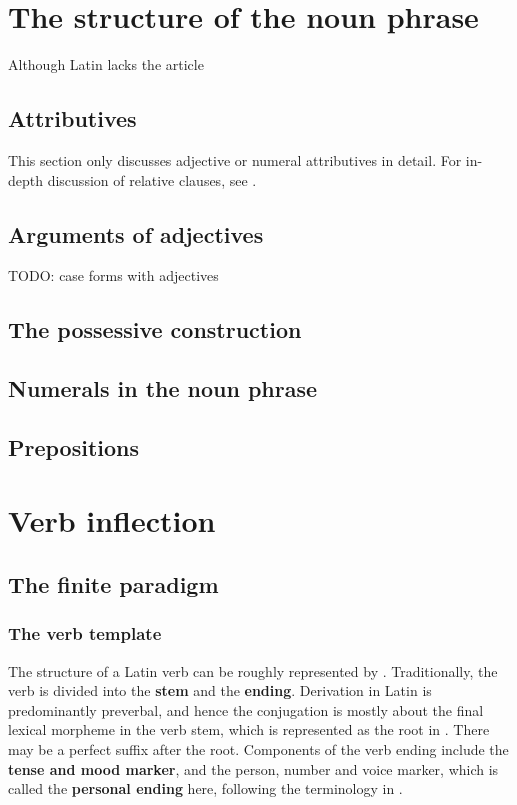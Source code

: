 \documentclass[a4paper, oneside]{report}
\newcommand*{\citesec}[1]{\S~{#1}}
\newcommand*{\concept}[1]{\textbf{#1}}
\begin{document}
\chapter{The structure of the noun phrase}

Although Latin lacks the article 

\section{Attributives}

This section only discusses adjective or numeral attributives in detail.
For in-depth discussion of relative clauses, see .

\section{Arguments of adjectives}

TODO: case forms with adjectives

\section{The possessive construction}

\section{Numerals in the noun phrase}

\section{Prepositions}

\chapter{Verb inflection}

\section{The finite paradigm}

\subsection{The verb template}

The structure of a Latin verb 
can be roughly represented by .
Traditionally, the verb is divided 
into the \concept{stem} and the \concept{ending}.
Derivation in Latin is predominantly preverbal,
and hence the conjugation is mostly about the final lexical morpheme in the verb stem,
which is represented as the root in .
There may be a perfect suffix after the root.
Components of the verb ending include 
the \concept{tense and mood marker},
and the person, number and voice marker,
which is called the \concept{personal ending} here, 
following the terminology in \citet[\citesec{165}]{allen1903allen}.
\end{document}
